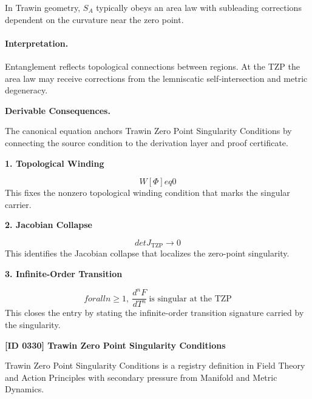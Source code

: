 In Trawin geometry, $S_A$ typically obeys an area law with subleading corrections dependent on the curvature near the zero point.

\paragraph{Interpretation.}

Entanglement reflects topological connections between regions.  At the TZP the area law may receive corrections from the lemniscatic self‑intersection and metric degeneracy.

\par\vspace{0.35em}
\noindent\textbf{Derivable Consequences.}\quad
\begingroup
\footnotesize
\raggedright
The canonical equation anchors Trawin Zero Point Singularity Conditions by connecting the source condition to the derivation layer and proof certificate.
\par\endgroup

\noindent\textbf{1. Topological Winding}\par
\[
W[\Phi] eq 0
\]
\noindent This fixes the nonzero topological winding condition that marks the singular carrier.\par
\noindent\textbf{2. Jacobian Collapse}\par
\[
det J_{\mathrm{TZP}}\to 0
\]
\noindent This identifies the Jacobian collapse that localizes the zero-point singularity.\par
\noindent\textbf{3. Infinite-Order Transition}\par
\[
forall n\ge1,\ \frac{d^nF}{dT^n}\ \text{is singular at the TZP}
\]
\noindent This closes the entry by stating the infinite-order transition signature carried by the singularity.\par

\clearpage
\noindent\textbf{[ID 0330] Trawin Zero Point Singularity Conditions}\par
\vspace{0.35em}
\begingroup\small
{}
Trawin Zero Point Singularity Conditions is a registry definition in Field Theory and Action Principles with secondary pressure from Manifold and Metric Dynamics.

